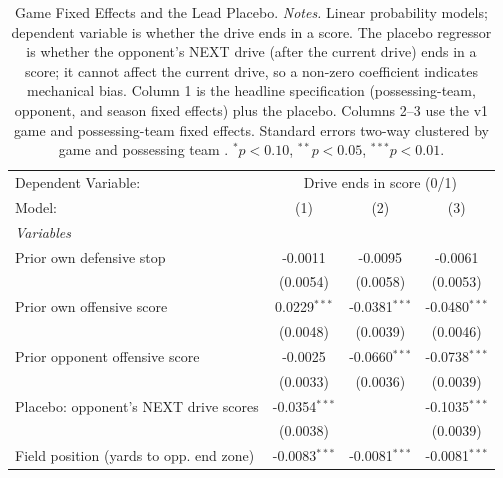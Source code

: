 
\begin{table}[htbp]
   \caption{\label{tab:gamefe} Game Fixed Effects and the Lead Placebo. \textit{Notes.} Linear probability models; dependent variable is whether the drive ends in a score. The placebo regressor is whether the opponent's NEXT drive (after the current drive) ends in a score; it cannot affect the current drive, so a non-zero coefficient indicates mechanical bias. Column 1 is the headline specification (possessing-team, opponent, and season fixed effects) plus the placebo. Columns 2--3 use the v1 game and possessing-team fixed effects. Standard errors two-way clustered by game and possessing team \citep{cameron2011robust}. $^{*}p<0.10$, $^{**}p<0.05$, $^{***}p<0.01$.}
   \centering
   \begin{tabular}{lccc}
      \tabularnewline \midrule \midrule
      Dependent Variable: & \multicolumn{3}{c}{Drive ends in score (0/1)}\\
      Model:                                  & (1)                           & (2)                           & (3)\\  
      \midrule
      \emph{Variables}\\
      Prior own defensive stop                & -0.0011                       & -0.0095                       & -0.0061\\   
                                              & (0.0054)                      & (0.0058)                      & (0.0053)\\   
      Prior own offensive score               & 0.0229$^{***}$                & -0.0381$^{***}$               & -0.0480$^{***}$\\   
                                              & (0.0048)                      & (0.0039)                      & (0.0046)\\   
      Prior opponent offensive score          & -0.0025                       & -0.0660$^{***}$               & -0.0738$^{***}$\\   
                                              & (0.0033)                      & (0.0036)                      & (0.0039)\\   
      Placebo: opponent's NEXT drive scores   & -0.0354$^{***}$               &                               & -0.1035$^{***}$\\   
                                              & (0.0038)                      &                               & (0.0039)\\   
      Field position (yards to opp. end zone) & -0.0083$^{***}$               & -0.0081$^{***}$               & -0.0081$^{***}$\\   

\end{tabular}
\end{table}
